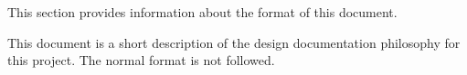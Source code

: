 This section provides information about the format of this document.

This document is a short description of the design documentation philosophy for this project.
The normal \SDP format is not followed.

